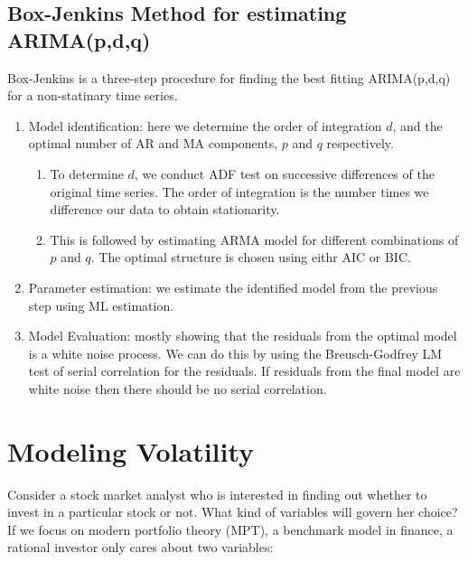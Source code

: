 \documentclass[]{book}
\providecommand{\tightlist}{%
  \setlength{\itemsep}{0pt}\setlength{\parskip}{0pt}}
\theoremstyle{definition}
\theoremstyle{definition}
\theoremstyle{definition}
\theoremstyle{remark}
\begin{document}
\hypertarget{box-jenkins-method-for-estimating-arimapdq}{%
\section{Box-Jenkins Method for estimating ARIMA(p,d,q)}\label{box-jenkins-method-for-estimating-arimapdq}}

Box-Jenkins is a three-step procedure for finding the best fitting ARIMA(p,d,q) for a non-statinary time series.

\begin{enumerate}
\def\labelenumi{\arabic{enumi}.}
\item
  Model identification: here we determine the order of integration \(d\), and the optimal number of AR and MA components, \(p\) and \(q\) respectively.

  \begin{enumerate}
  \def\labelenumii{\roman{enumii}.}
  \tightlist
  \item
    To determine \(d\), we conduct ADF test on successive differences of the original time series. The order of integration is the number times we difference our data to obtain stationarity.
  \item
    This is followed by estimating ARMA model for different combinations of \(p\) and \(q\). The optimal structure is chosen using eithr AIC or BIC.
  \end{enumerate}
\item
  Parameter estimation: we estimate the identified model from the previous step using ML estimation.
\item
  Model Evaluation: mostly showing that the residuals from the optimal model is a white noise process. We can do this by using the Breusch-Godfrey LM test of serial correlation for the residuals. If residuals from the final model are white noise then there should be no serial correlation.
\end{enumerate}

\hypertarget{modeling-volatility}{%
\chapter{Modeling Volatility}\label{modeling-volatility}}

Consider a stock market analyst who is interested in finding out whether to invest in a particular stock or not. What kind of variables will govern her choice? If we focus on modern portfolio theory (MPT), a benchmark model in finance, a rational investor only cares about two variables:
\end{document}
